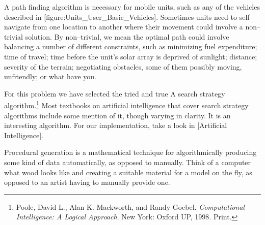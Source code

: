 A path finding algorithm is necessary for mobile units, such as any of the vehicles described in [figure:Units_User_Basic_Vehicles]. Sometimes units need to self--navigate from one location to another where their movement could involve a non--trivial solution. By non--trivial, we mean the optimal path could involve balancing a number of different constraints, such as minimizing fuel expenditure; time of travel; time before the unit's solar array is deprived of sunlight; distance; severity of the terrain; negotiating obstacles, some of them possibly moving, unfriendly; or what have you.
\crlf

    {}

For this problem we have selected the tried and true A\high{*} search strategy algorithm.\footnote{Poole, David L., Alan K. Mackworth, and Randy Goebel. {\it Computational Intelligence: A Logical Approach}. New York: Oxford UP, 1998. Print.} Most textbooks on artificial intelligence that cover search strategy algorithms include some mention of it, though varying in clarity. It is an interesting algorithm. For our implementation, take a look in [Artificial Intelligence].

    {}

Procedural generation is a mathematical technique for algorithmically producing some kind of data automatically, as opposed to manually. Think of a computer  what wood looks like and creating a suitable material for a model on the fly, as opposed to an artist having to manually provide one. 

    {}
    {}
    {}
    {}
    {}
    {}
    {}
    \stopcombination

